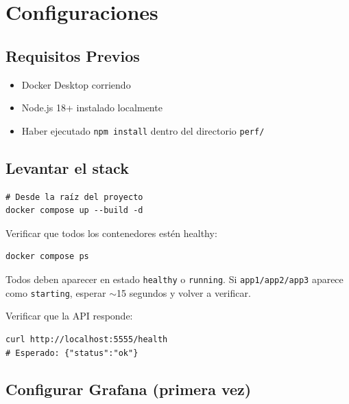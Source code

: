 \section{Configuraciones}

\subsection{Requisitos Previos}

\begin{itemize}[leftmargin=*]
    \item Docker Desktop corriendo
    \item Node.js 18+ instalado localmente
    \item Haber ejecutado \texttt{npm install} dentro del directorio \texttt{perf/}
\end{itemize}

\subsection{Levantar el stack}

\begin{verbatim}
# Desde la raíz del proyecto
docker compose up --build -d
\end{verbatim}

Verificar que todos los contenedores estén healthy:

\begin{verbatim}
docker compose ps
\end{verbatim}

Todos deben aparecer en estado \texttt{healthy} o \texttt{running}. Si \texttt{app1/app2/app3} aparece como \texttt{starting}, esperar \(\sim\)15 segundos y volver a verificar.

Verificar que la API responde:

\begin{verbatim}
curl http://localhost:5555/health
# Esperado: {"status":"ok"}
\end{verbatim}

\subsection{Configurar Grafana (primera vez)}

